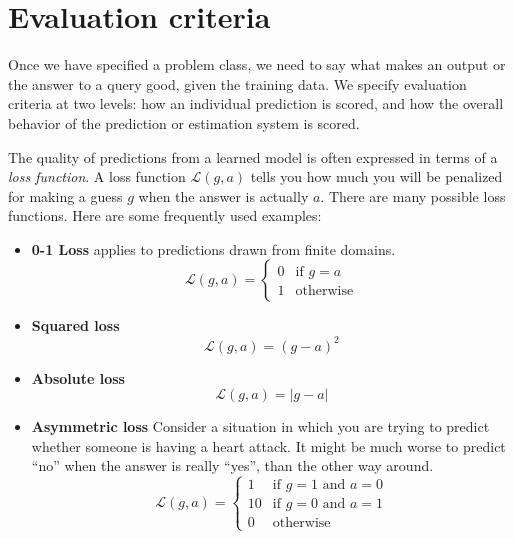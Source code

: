 
\section{Evaluation criteria}
\label{sec-evaluation}

Once we have specified a problem class, we need to say what makes an
output or the answer to a query good, given the training data.  We specify evaluation criteria at two levels:  how an individual prediction is scored, and how the overall behavior of the prediction or estimation system is scored.

The quality of predictions from a learned model is often
expressed in terms of a {\em loss function}.  A
loss function $\mathcal{L}(g, a)$ tells you how much you will be penalized
for making a guess $g$ when the answer is actually $a$.  There are many possible loss
functions.  Here are some frequently used examples:
\begin{itemize}
  \item {\bf 0-1 Loss} applies to predictions drawn from finite
        domains.
        \[\mathcal{L}(g, a) = \begin{cases}
            0 & \text{if $g = a$} \\
            1 & \text{otherwise}
          \end{cases}\]
  \item {\bf Squared loss}
        \[\mathcal{L}(g, a) = (g - a)^2\]
  \item {\bf Absolute loss}
        \[\mathcal{L}(g, a) = |g - a|\]
  \item {\bf Asymmetric loss}
        Consider a situation in which  you are trying to predict whether
        someone is having a heart attack.  It might be much worse to predict
        ``no'' when the answer is really ``yes'', than the other way around.
        \[\mathcal{L}(g, a) = \begin{cases}
            1  & \text{if $g = 1$ and $a = 0$} \\
            10 & \text{if $g = 0$ and $a = 1$} \\
            0  & \text{otherwise}
          \end{cases}\]
\end{itemize}

